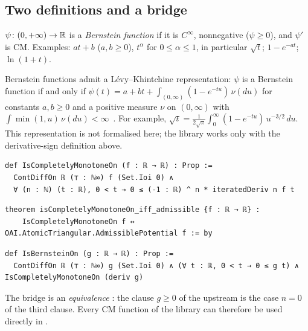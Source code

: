 \subsection{Two definitions and a bridge}
\begin{definition}
$\psi\colon(0,+\infty)\to\mathbb{R}$ is a \emph{Bernstein function} if it is $C^\infty$, nonnegative ($\psi\ge0$), and $\psi'$ is CM.
Examples: $at+b$ ($a,b\ge0$), $t^\alpha$ for $0\le\alpha\le1$, in particular $\sqrt t$; $1-e^{-at}$; $\ln(1+t)$.
\end{definition}
\begin{uniremark}\tierL{} Bernstein functions admit a Lévy--Khintchine representation: $\psi$ is a Bernstein function if
and only if $\psi(t)=a+bt+\int_{(0,\infty)}(1-e^{-tu})\,\nu(du)$ for constants $a,b\ge0$ and a positive measure $\nu$ on
$(0,\infty)$ with $\int\min(1,u)\,\nu(du)<\infty$~\cite{ch2ssv}. For example, $\sqrt t=\frac1{2\sqrt\pi}\int_0^\infty(1-e^{-tu})\,u^{-3/2}\,du$.
This representation is not formalised here; the library works only with the derivative-sign definition above.
\end{uniremark}
\begin{leanbox}
\begin{lstlisting}[style=chdeux]
def IsCompletelyMonotoneOn (f : ℝ → ℝ) : Prop :=
  ContDiffOn ℝ (⊤ : ℕ∞) f (Set.Ioi 0) ∧
  ∀ (n : ℕ) (t : ℝ), 0 < t → 0 ≤ (-1 : ℝ) ^ n * iteratedDeriv n f t
\end{lstlisting}
\begin{lstlisting}[style=chdeux]
theorem isCompletelyMonotoneOn_iff_admissible {f : ℝ → ℝ} :
    IsCompletelyMonotoneOn f ↔ OAI.AtomicTriangular.AdmissiblePotential f := by
\end{lstlisting}
\begin{lstlisting}[style=chdeux]
def IsBernsteinOn (g : ℝ → ℝ) : Prop :=
  ContDiffOn ℝ (⊤ : ℕ∞) g (Set.Ioi 0) ∧ (∀ t : ℝ, 0 < t → 0 ≤ g t) ∧ IsCompletelyMonotoneOn (deriv g)
\end{lstlisting}
\end{leanbox}
\noindent The bridge  is an \emph{equivalence} \tierA: the clause $g\ge0$ of
the upstream is the case $n=0$ of the third clause. Every CM function of the library can therefore be used directly in
.

